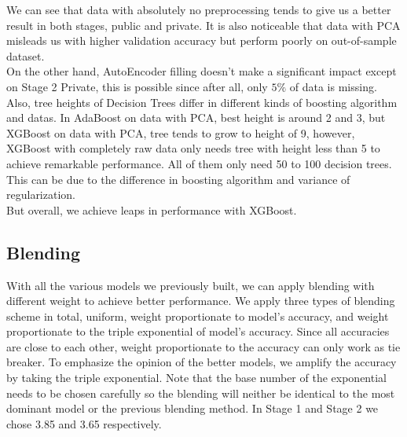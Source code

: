 \documentclass[12pt,a4paper]{article}
\begin{document}
We can see that data with absolutely no preprocessing tends to give us a better result in both stages, public and private. It is also noticeable that data with PCA misleads us with higher validation accuracy but perform poorly on out-of-sample dataset. \\
On the other hand, AutoEncoder filling doesn't make a significant impact except on Stage 2 Private, this is possible since after all, only $5\%$ of data is missing.\\
Also, tree heights of Decision Trees differ in different kinds of boosting algorithm and datas. In AdaBoost on data with PCA, best height is around 2 and 3, but XGBoost on data with PCA, tree tends to grow to height of 9, however, XGBoost with completely raw data only needs tree with height less than 5 to achieve remarkable performance. All of them only need 50 to 100 decision trees. This can be due to the difference in boosting algorithm and variance of regularization.\\
But overall, we achieve leaps in performance with XGBoost.



\subsection{Blending}
With all the various models we previously built, we can apply blending with different weight to achieve better performance. 
We apply three types of blending scheme in total, uniform, weight proportionate to model's accuracy, and weight proportionate to the triple exponential of model's accuracy. 
Since all accuracies are close to each other, weight proportionate to the accuracy can only work as tie breaker. To emphasize the opinion of the better models, we amplify the accuracy by taking the triple exponential. 
Note that the base number of the exponential needs to be chosen carefully so the blending will neither be identical to the most dominant model or the previous blending method. In Stage 1 and Stage 2 we chose 3.85 and 3.65 respectively.
\end{document}
